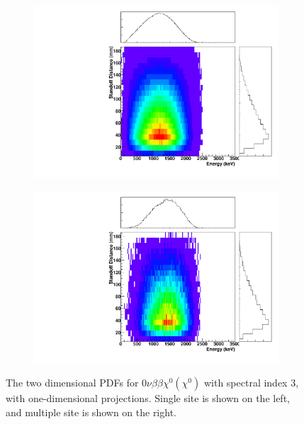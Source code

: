 \documentclass[herrin-thesis.tex]{subfiles}
\begin{document}
\begin{figure}[hp]
\centering
	\begin{subfigure}[b]{0.35\textwidth}
	\centering
	\includegraphics[width=\textwidth]{./plots/PDFs/analysis_pdf_bb0nX3_ss.pdf}
\end{subfigure}\hspace{0.1\textwidth}%
\begin{subfigure}[b]{0.35\textwidth}
	\centering
	\includegraphics[width=1\textwidth]{./plots/PDFs/analysis_pdf_bb0nX3_ms.pdf}
	\end{subfigure}
\caption[PDF for  \(0\nu\beta\beta\chi^{0}(\chi^{0})\)]{The two dimensional PDFs for \(0\nu\beta\beta\chi^{0}(\chi^{0})\) with spectral index 3, with one-dimensional projections. Single site is shown on the left, and multiple site is shown on the right.}
\label{fig:analysis_pdf_bb0nX3}
\end{figure}
\end{document}
